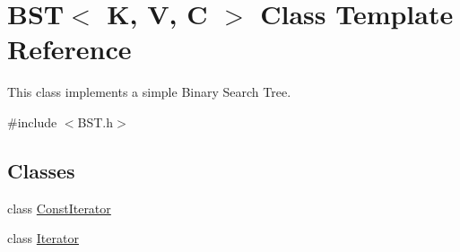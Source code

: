 \hypertarget{classBST}{}\section{B\+ST$<$ K, V, C $>$ Class Template Reference}
\label{classBST}


This class implements a simple Binary Search Tree.  




{\ttfamily \#include $<$B\+S\+T.\+h$>$}

\subsection*{Classes}
\begin{DoxyCompactItemize}
\item 
class \hyperlink{classBST_1_1ConstIterator}{Const\+Iterator}
\item 
class \hyperlink{classBST_1_1Iterator}{Iterator}
\end{DoxyCompactItemize}
